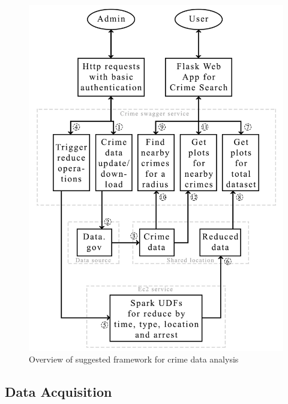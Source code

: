 \begin{figure}[htb]
	\centering\includegraphics[width=\columnwidth]{../images/overview.jpg}
	\caption{Overview
        of suggested framework for crime data
        analysis}\label{fig:overview}
\end{figure}

\subsection{Data Acquisition}



